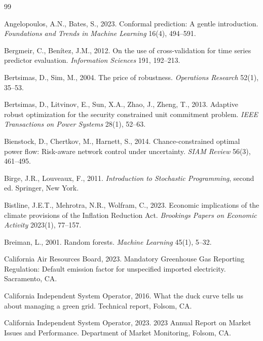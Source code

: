 \documentclass[preprint,12pt,authoryear]{elsarticle}
\begin{document}
\begin{thebibliography}{99}

Angelopoulos, A.N., Bates, S., 2023. Conformal prediction: A gentle introduction. \textit{Foundations and Trends in Machine Learning} 16(4), 494--591.

Bergmeir, C., Ben\'itez, J.M., 2012. On the use of cross-validation for time series predictor evaluation. \textit{Information Sciences} 191, 192--213.

Bertsimas, D., Sim, M., 2004. The price of robustness. \textit{Operations Research} 52(1), 35--53.

Bertsimas, D., Litvinov, E., Sun, X.A., Zhao, J., Zheng, T., 2013. Adaptive robust optimization for the security constrained unit commitment problem. \textit{IEEE Transactions on Power Systems} 28(1), 52--63.

Bienstock, D., Chertkov, M., Harnett, S., 2014. Chance-constrained optimal power flow: Risk-aware network control under uncertainty. \textit{SIAM Review} 56(3), 461--495.

Birge, J.R., Louveaux, F., 2011. \textit{Introduction to Stochastic Programming}, second ed. Springer, New York.

Bistline, J.E.T., Mehrotra, N.R., Wolfram, C., 2023. Economic implications of the climate provisions of the Inflation Reduction Act. \textit{Brookings Papers on Economic Activity} 2023(1), 77--157.

Breiman, L., 2001. Random forests. \textit{Machine Learning} 45(1), 5--32.

California Air Resources Board, 2023. Mandatory Greenhouse Gas Reporting Regulation: Default emission factor for unspecified imported electricity. Sacramento, CA.

California Independent System Operator, 2016. What the duck curve tells us about managing a green grid. Technical report, Folsom, CA.

California Independent System Operator, 2023. 2023 Annual Report on Market Issues and Performance. Department of Market Monitoring, Folsom, CA.


\end{thebibliography}
\end{document}
